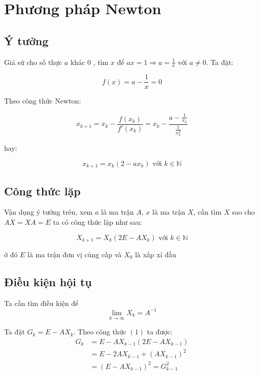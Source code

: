 \section{Phương pháp Newton}
        
    \subsection{Ý tưởng}
        \par Giả sử cho số thực $a$ khác 0 , tìm $x$ để $ax = 1 \Rightarrow a = \frac{1}{x}$ với $a \neq 0$. Ta đặt:

        $$ f(x) = a - \frac{1}{x} = 0 $$

        \par Theo công thức Newton:

        $$ x_{k+1} = x_{k} - \frac{f(x_{k})}{f'(x_{k})} = x_{k} - \frac{a - \frac{1}{x_{k}}}{\frac{1}{x_{k}^{2}}} $$

        \par hay: 
            
        $$ x_{k+1} = x_{k}(2 - ax_{k}) \text{ với } k \in \mathbb{N} $$
        
    \subsection{Công thức lặp}
        \par Vận dụng ý tưởng trên, xem $a$ là ma trận $A$, $x$ là ma trận $X$, cần tìm $X$ sao cho $ A X = X A = E $ ta có công thức lặp như sau:
            
        \begin{equation}
            X_{k+1} = X_{k}(2E - AX_{k}) \text{  với  } k \in \mathbb{N} 
        \end{equation}

        \par ở đó $E$ là ma trận đơn vị cùng cấp và $X_{0}$ là xấp xỉ đầu

    \subsection{Điều kiện hội tụ}
        \par Ta cần tìm điều kiện để 
        $$ \lim_{k \to \infty} X_{k} = A^{-1} $$
        
        \par Ta đặt $ G_{k} = E - AX_{k} $. Theo công thức $(1)$ ta được:
        \begin{align*}
            G_{k} &= E - AX_{k-1}(2E - AX_{k-1}) \\
                  &= E - 2AX_{k-1} + (AX_{k-1})^{2} \\
                  &= (E - AX_{k-1})^{2} = G_{k-1}^{2} 
        \end{align*}
        

